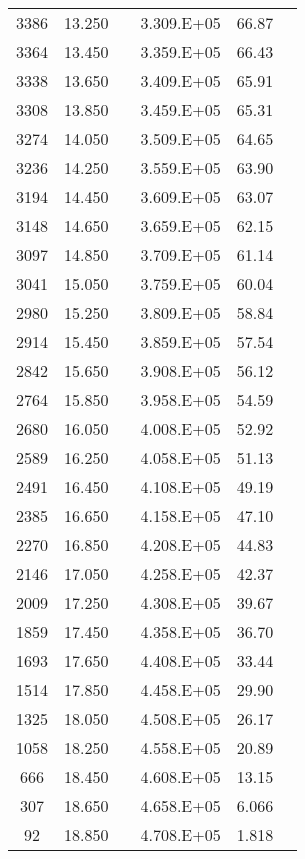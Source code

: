 \begin{longtable}{cccccc}
3386 & 13.250 &  & 3.309.E+05 & 66.87 &  \\
3364 & 13.450 &  & 3.359.E+05 & 66.43 &  \\
3338 & 13.650 &  & 3.409.E+05 & 65.91 &  \\
3308 & 13.850 &  & 3.459.E+05 & 65.31 &  \\
3274 & 14.050 &  & 3.509.E+05 & 64.65 &  \\
3236 & 14.250 &  & 3.559.E+05 & 63.90 &  \\
3194 & 14.450 &  & 3.609.E+05 & 63.07 &  \\
3148 & 14.650 &  & 3.659.E+05 & 62.15 &  \\
3097 & 14.850 &  & 3.709.E+05 & 61.14 &  \\
3041 & 15.050 &  & 3.759.E+05 & 60.04 &  \\
2980 & 15.250 &  & 3.809.E+05 & 58.84 &  \\
2914 & 15.450 &  & 3.859.E+05 & 57.54 &  \\
2842 & 15.650 &  & 3.908.E+05 & 56.12 &  \\
2764 & 15.850 &  & 3.958.E+05 & 54.59 &  \\
2680 & 16.050 &  & 4.008.E+05 & 52.92 &  \\
2589 & 16.250 &  & 4.058.E+05 & 51.13 &  \\
2491 & 16.450 &  & 4.108.E+05 & 49.19 &  \\
2385 & 16.650 &  & 4.158.E+05 & 47.10 &  \\
2270 & 16.850 &  & 4.208.E+05 & 44.83 &  \\
2146 & 17.050 &  & 4.258.E+05 & 42.37 &  \\
2009 & 17.250 &  & 4.308.E+05 & 39.67 &  \\
1859 & 17.450 &  & 4.358.E+05 & 36.70 &  \\
1693 & 17.650 &  & 4.408.E+05 & 33.44 &  \\
1514 & 17.850 &  & 4.458.E+05 & 29.90 &  \\
1325 & 18.050 &  & 4.508.E+05 & 26.17 &  \\
1058 & 18.250 &  & 4.558.E+05 & 20.89 &  \\
666 & 18.450 &  & 4.608.E+05 & 13.15 &  \\
307 & 18.650 &  & 4.658.E+05 & 6.066 &  \\
92 & 18.850 &  & 4.708.E+05 & 1.818 &  \\
     \hline
\end{longtable}

